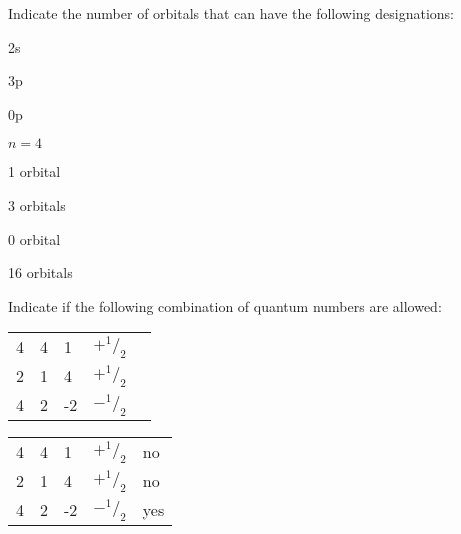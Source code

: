\documentclass[main.tex]{subfiles}
\begin{document}
\begin{multicols*}{2}
\vspace{-0.0cm}\begin{question}[ID=\the\value{numA}]
Indicate the number of orbitals that can have the following designations:
 \begin{inparaenum}[(a)]
\item    2s   %
\item    3p 	%
\item 0p	%
\item $n=4$	%
\end{inparaenum}
 \end{question}
\begin{solution}
 \begin{inparaenum}[(a)]
\item     1 orbital
\item     3 orbitals
\item  0 orbital	
\item  16 orbitals    
\end{inparaenum}
\hspace{0.1cm}\end{solution}
\vspace{-0.5cm}\begin{question}[ID=\the\value{numA}]
Indicate if the following combination of quantum numbers are allowed:\\
\begin{tabularx}{\columnwidth}{>{}m{.20\linewidth} *{4}{Y} }
  \toprule
{} & \heading{$\ell$}  &   &  &    \\
    	&	4	&	1	&	$+^1/_2$    \\
   2	&	1&		4	&	$+^1/_2$   \\
4		&2	&	-2	&	$-^1/_2$\\    
    \bottomrule
\end{tabularx}
 \end{question}
\begin{solution}
\begin{tabularx}{\columnwidth}{>{}m{.20\linewidth} *{4}{Y} }
  \toprule
{} & \heading{$\ell$}  &   &  &    \\
    	&	4	&	1	&	$+^1/_2$ & no   \\
   2	&	1&		4	&	$+^1/_2$ & no  \\
4		&2	&	-2	&	$-^1/_2$&yes\\    
    \bottomrule
\end{tabularx}
\hspace{0.1cm}\end{solution}


\end{multicols*}
\end{document}
